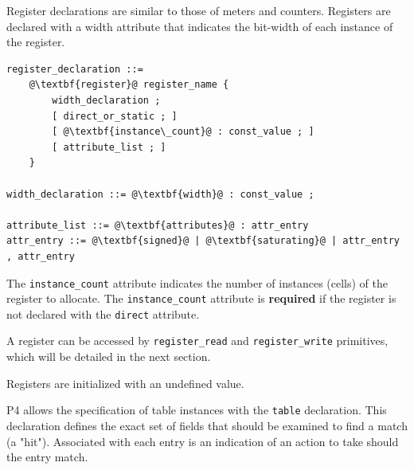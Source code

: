 \documentclass[12pt]{article}
\begin{document}
Register declarations are similar to those of meters and
counters. Registers are declared with a width
attribute that indicates the bit-width of each instance of
the register.

\begin{lstlisting}[frame=single,backgroundcolor=\color{bnfgreen},escapechar=\@]
register_declaration ::=
    @\textbf{register}@ register_name {
        width_declaration ;
        [ direct_or_static ; ]
        [ @\textbf{instance\_count}@ : const_value ; ]
        [ attribute_list ; ]
    }

width_declaration ::= @\textbf{width}@ : const_value ;

attribute_list ::= @\textbf{attributes}@ : attr_entry
attr_entry ::= @\textbf{signed}@ | @\textbf{saturating}@ | attr_entry , attr_entry
\end{lstlisting}


The \texttt{instance_count} attribute indicates the number of
instances (cells) of the register to allocate. The
\texttt{instance_count} attribute is \textbf{required} if the
register is not declared with the \texttt{direct} attribute.

%
%
%
%

A register can be accessed by \texttt{register_read} and
\texttt{register_write} primitives, which will be detailed in the
next section.

Registers are initialized with an undefined value.


P4 allows the specification of table instances with the \texttt{table}
declaration. This declaration defines the exact set of fields that
should be examined to find a match (a "hit").  Associated with each
entry is an indication of an action to take should the entry match.
\end{document}
